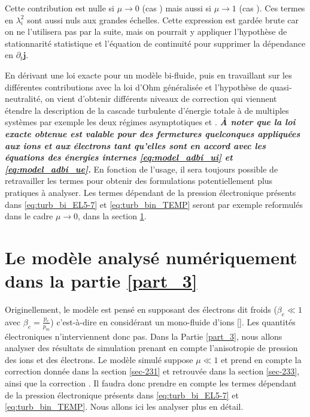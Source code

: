 Cette contribution est nulle si $\mu \rightarrow 0$ (cas ) mais aussi si $\mu \rightarrow 1$ (cas ). Ces termes en $\lambda_i^2$ sont aussi nuls aux grandes échelles.
Cette expression est gardée brute car on ne l'utilisera pas par la suite, mais on pourrait y appliquer l'hypothèse de stationnarité statistique et l'équation de continuité pour supprimer la dépendance en $\partial_t \boldsymbol{j}$.

 En dérivant une loi exacte pour un modèle bi-fluide, puis en travaillant sur les différentes contributions avec la loi d'Ohm généralisée et l'hypothèse de quasi-neutralité, on vient d'obtenir différents niveaux de correction qui viennent étendre la description de la cascade turbulente d'énergie totale à de multiples systèmes par exemple les deux régimes asymptotiques  et . \emph{\bf À noter que la loi exacte obtenue est valable pour des fermetures quelconques appliquées aux ions et aux électrons tant qu'elles sont en accord avec les équations des énergies internes \eqref{eq:model_adbi_ui} et \eqref{eq:model_adbi_ue}.} En fonction de l'usage, il sera toujours possible de retravailler les termes pour obtenir des formulations potentiellement plus pratiques à analyser. Les termes dépendant de la pression électronique présents dans \eqref{eq:turb_bi_EL5-7} et \eqref{eq:turb_bin_TEMP} seront par exemple reformulés dans le cadre $\mu \rightarrow 0$, dans la section \ref{sec-232}. 
% 
% 
% 
% 
\section{Le modèle analysé numériquement dans la partie \ref{part_3}}
\label{sec-232}

 Originellement, le modèle  est pensé en supposant des électrons dit \og froids \fg{} ($\beta_e \ll 1$ avec $\beta_e = \frac{p_e}{p_m}$) c'est-à-dire en considérant un mono-fluide d'ions [\cite{hunana_introductory_2019}]. Les quantités électroniques n'interviennent donc pas. Dans la Partie \ref{part_3}, nous allons analyser des résultats de simulation  prenant en compte l'anisotropie de pression des ions et des électrons. Le modèle simulé suppose $\mu \ll 1$ et prend en compte la correction  donnée dans la section \ref{sec-231} et retrouvée dans la section \ref{sec-233}, ainsi que la correction . Il faudra donc prendre en compte les termes dépendant de la pression électronique présents dans \eqref{eq:turb_bi_EL5-7} et \eqref{eq:turb_bin_TEMP}. Nous allons ici les analyser plus en détail. 


